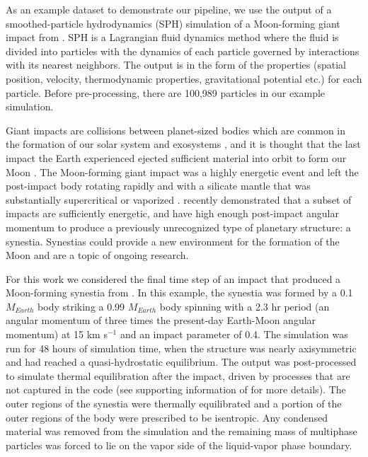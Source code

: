 \documentclass[fleqn,usenatbib,useAMS]{mnras}
\begin{document}

As an example dataset to demonstrate our pipeline, we use the output of a smoothed-particle hydrodynamics (SPH) \citep{Gingold77, Price07} simulation of a Moon-forming giant impact from \cite{Lock18}. SPH is a Lagrangian fluid dynamics method where the fluid is divided into particles with the dynamics of each particle governed by interactions with its nearest neighbors. The output is in the form of the properties (spatial position, velocity, thermodynamic properties, gravitational potential etc.) for each particle. Before pre-processing, there are 100,989 particles in our example simulation. \par

Giant impacts are collisions between planet-sized bodies which are common in the formation of our solar system and exosystems \citep{Raymond18}, and it is thought that the last impact the Earth experienced ejected sufficient material into orbit to form our Moon \citep{Cameron76, Hartmann75}. The Moon-forming giant impact was a highly energetic event and left the post-impact body rotating rapidly and with a silicate mantle that was substantially supercritical or vaporized \citep{Lock18, LockStewart17, Nakajima15}. \cite{LockStewart17} recently demonstrated that a subset of impacts are sufficiently energetic, and have high enough post-impact angular momentum to produce a previously unrecognized type of planetary structure: a synestia. Synestias could provide a new environment for the formation of the Moon \citep{Lock18} and are a topic of ongoing research. \par

For this work we considered the final time step of an impact that produced a Moon-forming synestia from \cite{Lock18}. In this example, the synestia was formed by a 0.1 $M_{Earth}$ body striking a 0.99 $M_{Earth}$ body spinning with a 2.3 hr period (an angular momentum of three times the present-day Earth-Moon angular momentum) at 15 km s$^{-1}$ and an impact parameter of 0.4. The simulation was run for 48 hours of simulation time, when the structure was nearly axisymmetric and had reached a quasi-hydrostatic equilibrium. The output was post-processed to simulate thermal equilibration after the impact, driven by processes that are not captured in the code (see supporting information of \cite{Lock18} for more details). The outer regions of the synestia were thermally equilibrated and a portion of the outer regions of the body were prescribed to be isentropic. Any condensed material was removed from the simulation and the remaining mass of multiphase particles was forced to lie on the vapor side of the liquid-vapor phase boundary. \par
\end{document}
